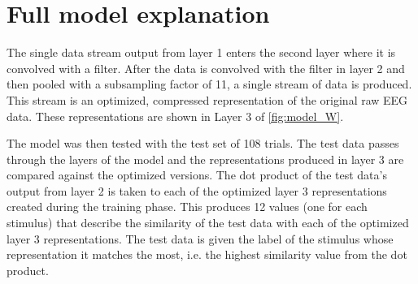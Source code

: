 \section{Full model explanation}
The single data stream output from layer 1 enters the second layer where it is convolved with a filter. 
After the data is convolved with the filter in layer 2 and then pooled with a subsampling factor of 11, a single stream of data is produced.
This stream is an optimized, compressed representation of the original raw EEG data.
These representations are shown in Layer 3 of \autoref{fig:model_W}. 

The model was then tested with the test set of 108 trials. 
The test data passes through the layers of the model and the representations produced in layer 3 are compared against the optimized versions. 
The dot product of the test data's output from layer 2 is taken to each of the optimized layer 3 representations created during the training phase. 
This produces 12 values (one for each stimulus) that describe the similarity of the test data with each of the optimized layer 3 representations. 
The test data is given the label of the stimulus whose representation it matches the most, i.e. the highest similarity value from the dot product. 
